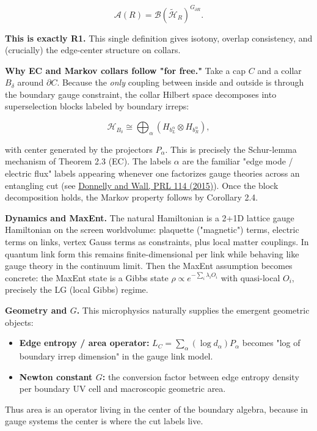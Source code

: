 \[
\mathcal{A}(R) = \mathcal{B}(\tilde{\mathcal{H}}_R)^{G_{\partial R}}.
\]

\textbf{This is exactly R1.} This single definition gives isotony, overlap consistency, and (crucially) the edge-center structure on collars.

\textbf{Why EC and Markov collars follow "for free."} Take a cap \(C\) and a collar \(B_\delta\) around \(\partial C\). Because the \emph{only} coupling between inside and outside is through the boundary gauge constraint, the collar Hilbert space decomposes into superselection blocks labeled by boundary irreps:

\[
\mathcal{H}_{B_\delta} \cong \bigoplus_\alpha (H_{b_L^\alpha} \otimes H_{b_R^\alpha}),
\]

with center generated by the projectors \(P_\alpha\). This is precisely the Schur-lemma mechanism of Theorem 2.3 (EC). The labels \(\alpha\) are the familiar "edge mode / electric flux" labels appearing whenever one factorizes gauge theories across an entangling cut (see \href{https://link.aps.org/doi/10.1103/PhysRevLett.114.111603}{Donnelly and Wall, PRL 114 (2015)}). Once the block decomposition holds, the Markov property follows by Corollary 2.4.

\textbf{Dynamics and MaxEnt.} The natural Hamiltonian is a 2+1D lattice gauge Hamiltonian on the screen worldvolume: plaquette ("magnetic") terms, electric terms on links, vertex Gauss terms as constraints, plus local matter couplings. In quantum link form this remains finite-dimensional per link while behaving like gauge theory in the continuum limit. Then the MaxEnt assumption becomes concrete: the MaxEnt state is a Gibbs state \(\rho \propto e^{-\sum_i \lambda_i O_i}\) with quasi-local \(O_i\), precisely the LG (local Gibbs) regime.

\textbf{Geometry and \(G\).} This microphysics naturally supplies the emergent geometric objects:

\begin{itemize}
\tightlist
\item
  \textbf{Edge entropy / area operator:} \(L_C = \sum_\alpha (\log d_\alpha) P_\alpha\) becomes "log of boundary irrep dimension" in the gauge link model.
\item
  \textbf{Newton constant \(G\):} the conversion factor between edge entropy density per boundary UV cell and macroscopic geometric area.
\end{itemize}

Thus area is an operator living in the center of the boundary algebra, because in gauge systems the center is where the cut labels live.

